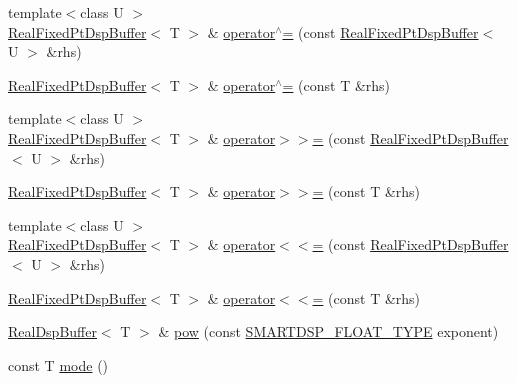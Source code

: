\begin{DoxyCompactItemize}
\item 
{\footnotesize template$<$class U $>$ }\\\hyperlink{class_smart_dsp_1_1_real_fixed_pt_dsp_buffer}{Real\+Fixed\+Pt\+Dsp\+Buffer}$<$ T $>$ \& \hyperlink{class_smart_dsp_1_1_real_fixed_pt_dsp_buffer_a4c40baa57ae2f4cfc919eaca5c4cb999}{operator$^\wedge$=} (const \hyperlink{class_smart_dsp_1_1_real_fixed_pt_dsp_buffer}{Real\+Fixed\+Pt\+Dsp\+Buffer}$<$ U $>$ \&rhs)
\item 
\hyperlink{class_smart_dsp_1_1_real_fixed_pt_dsp_buffer}{Real\+Fixed\+Pt\+Dsp\+Buffer}$<$ T $>$ \& \hyperlink{class_smart_dsp_1_1_real_fixed_pt_dsp_buffer_af20c35cfbc0d69a5e24766ecd4984022}{operator$^\wedge$=} (const T \&rhs)
\item 
{\footnotesize template$<$class U $>$ }\\\hyperlink{class_smart_dsp_1_1_real_fixed_pt_dsp_buffer}{Real\+Fixed\+Pt\+Dsp\+Buffer}$<$ T $>$ \& \hyperlink{class_smart_dsp_1_1_real_fixed_pt_dsp_buffer_a7f6d2c641c4e827fe9f02ba11bb2d3c3}{operator$>$$>$=} (const \hyperlink{class_smart_dsp_1_1_real_fixed_pt_dsp_buffer}{Real\+Fixed\+Pt\+Dsp\+Buffer}$<$ U $>$ \&rhs)
\item 
\hyperlink{class_smart_dsp_1_1_real_fixed_pt_dsp_buffer}{Real\+Fixed\+Pt\+Dsp\+Buffer}$<$ T $>$ \& \hyperlink{class_smart_dsp_1_1_real_fixed_pt_dsp_buffer_a733c7adf5561680dddf02acc8ad857ed}{operator$>$$>$=} (const T \&rhs)
\item 
{\footnotesize template$<$class U $>$ }\\\hyperlink{class_smart_dsp_1_1_real_fixed_pt_dsp_buffer}{Real\+Fixed\+Pt\+Dsp\+Buffer}$<$ T $>$ \& \hyperlink{class_smart_dsp_1_1_real_fixed_pt_dsp_buffer_a3a2420192b47c2f4e104410247445841}{operator$<$$<$=} (const \hyperlink{class_smart_dsp_1_1_real_fixed_pt_dsp_buffer}{Real\+Fixed\+Pt\+Dsp\+Buffer}$<$ U $>$ \&rhs)
\item 
\hyperlink{class_smart_dsp_1_1_real_fixed_pt_dsp_buffer}{Real\+Fixed\+Pt\+Dsp\+Buffer}$<$ T $>$ \& \hyperlink{class_smart_dsp_1_1_real_fixed_pt_dsp_buffer_a6c4ce36df966d4b3df40cbf4264fcba0}{operator$<$$<$=} (const T \&rhs)
\item 
\hyperlink{class_smart_dsp_1_1_real_dsp_buffer}{Real\+Dsp\+Buffer}$<$ T $>$ \& \hyperlink{class_smart_dsp_1_1_real_fixed_pt_dsp_buffer_a18baa3dd00f8f78b46c22086859ddd53}{pow} (const \hyperlink{_dsp_buffer_8h_a9ed4123d332590f7a6161bc2061eac49}{S\+M\+A\+R\+T\+D\+S\+P\+\_\+\+F\+L\+O\+A\+T\+\_\+\+T\+Y\+P\+E} exponent)
\item 
const T \hyperlink{class_smart_dsp_1_1_real_fixed_pt_dsp_buffer_a808320927290a8bbb67a14197cf46f9f}{mode} ()
\end{DoxyCompactItemize}
